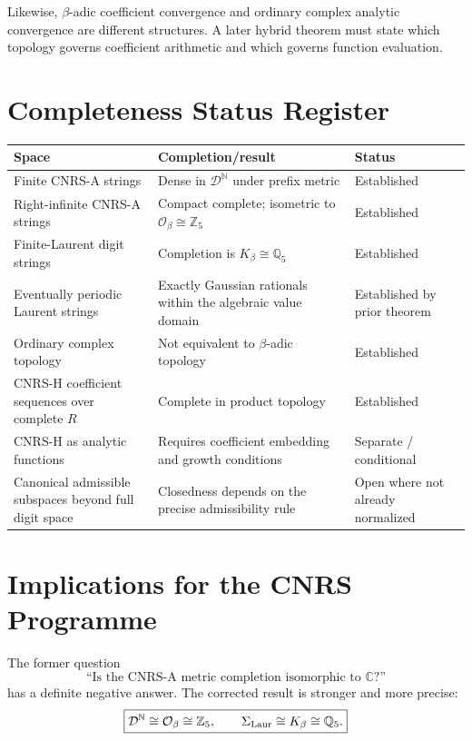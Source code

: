 \documentclass[11pt]{article}
\newcommand{\Z}{\mathbb Z}
\newcommand{\Q}{\mathbb Q}
\newcommand{\C}{\mathbb C}
\newcommand{\N}{\mathbb N}
\newcommand{\Db}{\mathcal D}
\newcommand{\Ob}{\mathcal O_\beta}
\newcommand{\Kb}{K_\beta}
\begin{document}
Likewise, $\beta$-adic coefficient convergence and ordinary complex analytic convergence are different structures.  A later hybrid theorem must state which topology governs coefficient arithmetic and which governs function evaluation.

\section{Completeness Status Register}

\begin{center}
\begin{tabular}{p{}p{}p{}}
\toprule
Space & Completion/result & Status \\
\midrule
Finite CNRS-A strings & Dense in $\Db^\N$ under prefix metric & Established \\
Right-infinite CNRS-A strings & Compact complete; isometric to $\Ob\cong\Z_5$ & Established \\
Finite-Laurent digit strings & Completion is $\Kb\cong\Q_5$ & Established \\
Eventually periodic Laurent strings & Exactly Gaussian rationals within the algebraic value domain & Established by prior theorem \\
Ordinary complex topology & Not equivalent to $\beta$-adic topology & Established \\
CNRS-H coefficient sequences over complete $R$ & Complete in product topology & Established \\
CNRS-H as analytic functions & Requires coefficient embedding and growth conditions & Separate / conditional \\
Canonical admissible subspaces beyond full digit space & Closedness depends on the precise admissibility rule & Open where not already normalized \\
\bottomrule
\end{tabular}
\end{center}

\section{Implications for the CNRS Programme}

The former question
\[
\text{``Is the CNRS-A metric completion isomorphic to }\C\text{?''}
\]
has a definite negative answer.  The corrected result is stronger and more precise:
\[
\boxed{
\Db^\N\cong\Ob\cong\Z_5,
\qquad
\Sigma_{\rm Laur}\cong\Kb\cong\Q_5.
}
\]
\end{document}
